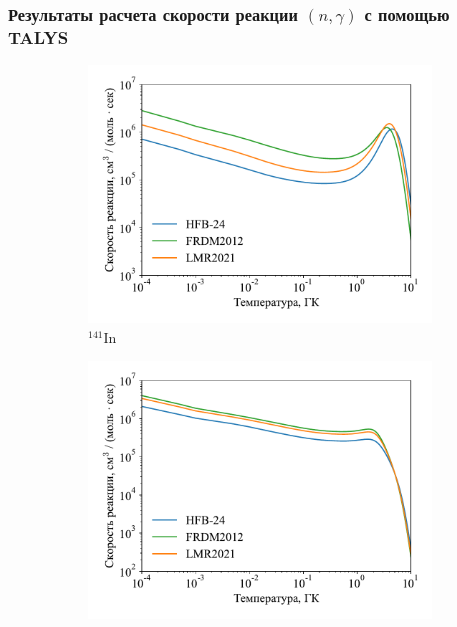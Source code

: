 \subsubsection{Результаты расчета скорости реакции $(n,\gamma)$ с помощью TALYS}

\begin{figure}
  \centering
  \begin{subfigure}{0.48\textwidth}
    \centering
    \includegraphics[width=\textwidth]{pics/rate_in141.pdf}
    \caption{${}^{141}$In}
    \label{fig:ng_rate:141in}
  \end{subfigure}
  \hfill
  \begin{subfigure}{0.48\textwidth}
    \centering
    \includegraphics[width=\textwidth]{pics/rate_in142.pdf}

\end{subfigure}
\end{figure}
